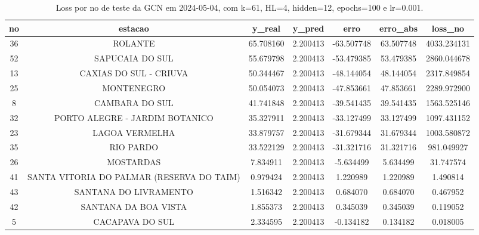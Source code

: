 \begin{table}[h]
\centering
\caption{Loss por no de teste da GCN em 2024-05-04, com k=61, HL=4, hidden=12, epochs=100 e lr=0.001.}
\label{tab:gcn_loss_k61_hl4_h12_e100_d20240504}
\begin{tabular}{ccccccc}
\toprule
no & estacao & y\_real & y\_pred & erro & erro\_abs & loss\_no \\
\midrule
36 & ROLANTE & 65.708160 & 2.200413 & -63.507748 & 63.507748 & 4033.234131 \\
52 & SAPUCAIA DO SUL & 55.679798 & 2.200413 & -53.479385 & 53.479385 & 2860.044678 \\
13 & CAXIAS DO SUL - CRIUVA & 50.344467 & 2.200413 & -48.144054 & 48.144054 & 2317.849854 \\
25 & MONTENEGRO & 50.054073 & 2.200413 & -47.853661 & 47.853661 & 2289.972900 \\
8 & CAMBARA DO SUL & 41.741848 & 2.200413 & -39.541435 & 39.541435 & 1563.525146 \\
32 & PORTO ALEGRE - JARDIM BOTANICO & 35.327911 & 2.200413 & -33.127499 & 33.127499 & 1097.431152 \\
23 & LAGOA VERMELHA & 33.879757 & 2.200413 & -31.679344 & 31.679344 & 1003.580872 \\
35 & RIO PARDO & 33.522129 & 2.200413 & -31.321716 & 31.321716 & 981.049927 \\
26 & MOSTARDAS & 7.834911 & 2.200413 & -5.634499 & 5.634499 & 31.747574 \\
41 & SANTA VITORIA DO PALMAR (RESERVA DO TAIM) & 0.979424 & 2.200413 & 1.220989 & 1.220989 & 1.490814 \\
43 & SANTANA DO LIVRAMENTO & 1.516342 & 2.200413 & 0.684070 & 0.684070 & 0.467952 \\
42 & SANTANA DA BOA VISTA & 1.855373 & 2.200413 & 0.345039 & 0.345039 & 0.119052 \\
5 & CACAPAVA DO SUL & 2.334595 & 2.200413 & -0.134182 & 0.134182 & 0.018005 \\
\bottomrule
\end{tabular}
\end{table}
